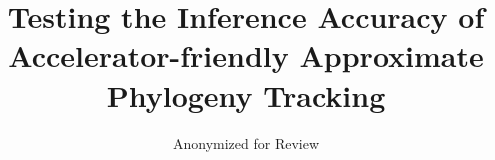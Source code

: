 \title{ Testing the Inference Accuracy of Accelerator-friendly Approximate Phylogeny Tracking }

\author{Anonymized for Review}


\maketitle
